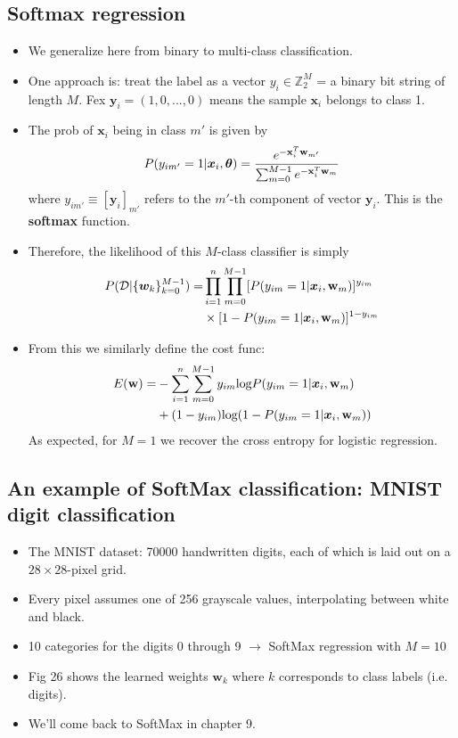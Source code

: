 \documentclass[norsk,a4paper,11pt]{article}
\begin{document}
\subsection{Softmax regression}
\begin{itemize}
	\item We generalize here from binary to multi-class classification.
	\item One approach is: treat the label as a vector $y_i \in \mathbb{Z}_2^M$ = a binary bit string of length $M$. Fex $\bm{y}_i = (1,0,...,0)$ means the sample $\bm{x}_i$ belongs to class 1.
	\item The prob of $\bm{x}_i$ being in class $m'$ is given by
	\begin{align}
		P(y_{im'} = 1|\bm{x}_i, \bm{\theta}) = \frac{e^{-\text{\textbf{x}}_i^T \text{\textbf{w}}_{m'}}}{\sum_{m=0}^{M-1} e^{-\text{\textbf{x}}_i^T \text{\textbf{w}}_m}}
	\end{align} 
	where $y_{im'} \equiv [\bm{y}_i]_{m'}$ refers to the $m'$-th component of vector $\bm{y}_i$. This is the \textbf{softmax} function.
	\item Therefore, the likelihood of this $M$-class classifier is simply
	\begin{align}
		P(\mathcal{D}| \{ \bm{w}_k \}_{k=0}^{M-1}) 
		=& \prod_{i=1}^n \prod_{m=0}^{M-1} [P(y_{im} = 1| \bm{x}_i, \text{\textbf{w}}_m)]^{y_{im}} \nonumber \\ 
		&\times [1 - P(y_{im} = 1| \bm{x}_i, \text{\textbf{w}}_m)]^{1 - y_{im}}
	\end{align}
	\item From this we similarly define the cost func:
	\begin{align}
		E(\text{\textbf{w}}) =& - \sum_{i=1}^n \sum_{m=0}^{M-1} y_{im} \text{log} P(y_{im} = 1| \bm{x}_i, \text{\textbf{w}}_m) \nonumber \\
		&+ (1 - y_{im}) \text{log} (1 - P(y_{im} = 1| \bm{x}_i, \text{\textbf{w}}_m))
	\end{align}
	As expected, for $M=1$ we recover the cross entropy for logistic regression.
\end{itemize}



\subsection{An example of SoftMax classification: MNIST digit classification}
\begin{itemize}
	\item The MNIST dataset: 70000 handwritten digits, each of which is laid out on a $28 \times 28$-pixel grid.
	\item Every pixel assumes one of 256 grayscale values, interpolating between white and black.
	\item 10 categories for the digits 0 through 9 $\rightarrow$ SoftMax regression with $M=10$
	\item Fig 26 shows the learned weights $\bm{w}_k$ where $k$ corresponds to class labels (i.e. digits). 
	\item We'll come back to SoftMax in chapter 9.
\end{itemize}
\end{document}
